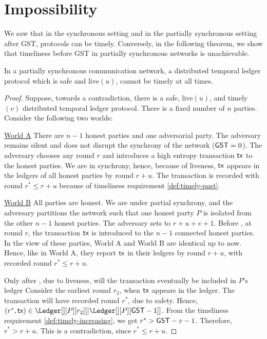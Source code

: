 \section{Impossibility}

We saw that in the synchronous setting and in the partially synchronous setting after GST,
protocols can be timely.
Conversely, in the following theorem, we show that timeliness before GST in partially
synchronous networks is unachievable.

\begin{theorem}
  In a partially synchronous communication network, a distributed temporal ledger protocol
  which is safe and live$(u)$, cannot be timely at all times.
\end{theorem}
\begin{proof}
  Suppose, towards a contradiction, there is a safe, live$(u)$, and timely$(v)$ distributed temporal ledger protocol.
  There is a fixed number of $n$ parties.
  Consider the following two worlds:

  \noindent
  \underline{World A}
  There are $n-1$ honest parties and one adversarial party. The adversary remains silent and
  does not disrupt the synchrony of the network ($\textsf{GST} = 0$).
  The adversary chooses any round $r$ and introduces a high entropy transaction $\textsf{tx}$ to the honest parties. We are in
  synchrony, hence, because of liveness, $\textsf{tx}$ appears in the ledgers of all honest parties
  by round $r + u$. The transaction is recorded with round $r^* \leq r + u$ because of
  timeliness requirement \ref{def:timely-past}.

  \noindent
  \underline{World B}
  All parties are honest. We are under partial synchrony, and the adversary partitions the network such that
  one honest party $P$ is isolated from the other $n-1$ honest parties.
  The adversary sets \gst to  $r + u + v + 1$.
  Before \gst, at round $r$, the transaction $\textsf{tx}$ is introduced to the $n-1$ connected
  honest parties. In the view of these parties,
  World A and World B are identical up to now. Hence, like in World A,
  they report $\textsf{tx}$ in their ledgers by round $r + u$, with recorded round $r^* \leq r + u$.

  Only after \gst, due to liveness, will the transaction eventually be included in $P$'s ledger
  Consider the earliest round $r_2$, when $\textsf{tx}$ appears in the ledger.
  The transaction will have recorded round $r^*$, due to safety.
  Hence, $(r^*, \tx) \in \Ledger[][P][r_2][|\Ledger[][P][\gst - 1]]$.
  From the timeliness requirement \ref{def:timely-increasing}, we
  get $r^* > \textsf{GST} - v - 1$. Therefore, $r^* > r + u$.
  This is a contradiction, since $r^* \leq r + u$.
  \Qed
\end{proof}

